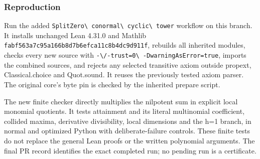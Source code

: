 \subsubsection{Reproduction}\label{conormal_cyclic_pr21:reproduction}

Run the added \nolinkurl{SplitZero\ conormal\ cyclic\ tower} workflow on this branch. It installs
unchanged Lean 4.31.0 and Mathlib \nolinkurl{fabf563a7c95a166b8d7b6efca11c8b4dc9d911f}, rebuilds all
inherited modules, checks every new source with \nolinkurl{-\/-trust=0\ -DwarningAsError=true}, imports
the combined sources, and rejects any selected transitive axiom outside propext, Classical.choice
and Quot.sound. It reuses the previously tested axiom parser. The original core's byte pin is
checked by the inherited prepare script.

The new finite checker directly multiplies the nilpotent sum in explicit local monomial quotients.
It tests attainment and its literal multinomial coefficient, collided maxima, derivative
divisibility, local dimensions and the h=1 branch, in normal and optimized Python with
deliberate-failure controls. These finite tests do not replace the general Lean proofs or the
written polynomial arguments. The final PR record identifies the exact completed run; no pending run
is a certificate.
